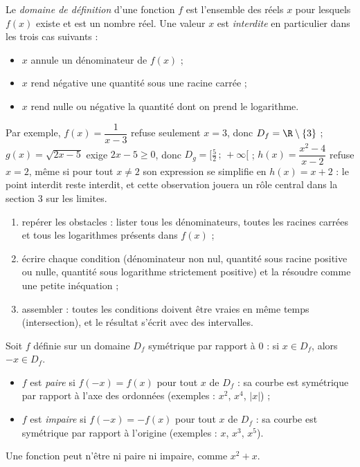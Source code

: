 \begin{definition}
Le \emph{domaine de définition} d'une fonction $f$ est l'ensemble des réels $x$ pour lesquels $f(x)$ existe et est un nombre réel. Une valeur $x$ est \emph{interdite} en particulier dans les trois cas suivants :
\begin{itemize}
\item $x$ annule un dénominateur de $f(x)$ ;
\item $x$ rend négative une quantité sous une racine carrée ;
\item $x$ rend nulle ou négative la quantité dont on prend le logarithme.
\end{itemize}
\end{definition}

Par exemple, $f(x) = \dfrac{1}{x-3}$ refuse seulement $x = 3$, donc $D_f = \R \setminus \{3\}$ ; $g(x) = \sqrt{2x-5}$ exige $2x - 5 \geq 0$, donc $D_g = [\frac{5}{2}\,;\,+\infty[$ ; $h(x) = \dfrac{x^{2}-4}{x-2}$ refuse $x = 2$, même si pour tout $x \neq 2$ son expression se simplifie en $h(x) = x + 2$ : le point interdit reste interdit, et cette observation jouera un rôle central dans la section 3 sur les limites.

\begin{methode}
\begin{enumerate}
\item repérer les obstacles : lister tous les dénominateurs, toutes les racines carrées et tous les logarithmes présents dans $f(x)$ ;
\item écrire chaque condition (dénominateur non nul, quantité sous racine positive ou nulle, quantité sous logarithme strictement positive) et la résoudre comme une petite inéquation ;
\item assembler : toutes les conditions doivent être vraies en même temps (intersection), et le résultat s'écrit avec des intervalles.
\end{enumerate}
\end{methode}

\begin{propriete}
Soit $f$ définie sur un domaine $D_f$ symétrique par rapport à $0$ : si $x \in D_f$, alors $-x \in D_f$.
\begin{itemize}
\item $f$ est \emph{paire} si $f(-x) = f(x)$ pour tout $x$ de $D_f$ : sa courbe est symétrique par rapport à l'axe des ordonnées (exemples : $x^{2}$, $x^{4}$, $\lvert x \rvert$) ;
\item $f$ est \emph{impaire} si $f(-x) = -f(x)$ pour tout $x$ de $D_f$ : sa courbe est symétrique par rapport à l'origine (exemples : $x$, $x^{3}$, $x^{5}$).
\end{itemize}
Une fonction peut n'être ni paire ni impaire, comme $x^{2} + x$.
\end{propriete}

